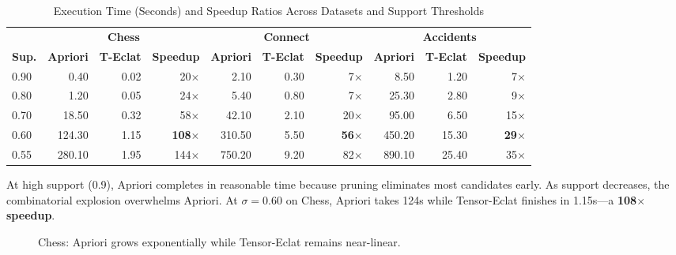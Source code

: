 \documentclass[conference]{IEEEtran}
\begin{document}
\begin{table}[t]
\caption{Execution Time (Seconds) and Speedup Ratios Across Datasets and Support Thresholds}
\centering
\begin{tabular}{@{}l|rrr|rrr|rrr@{}}
\toprule
 & \multicolumn{3}{c|}{\textbf{Chess}} & \multicolumn{3}{c|}{\textbf{Connect}} & \multicolumn{3}{c}{\textbf{Accidents}} \\
\textbf{Sup.} & \textbf{Apriori} & \textbf{T-Eclat} & \textbf{Speedup} & \textbf{Apriori} & \textbf{T-Eclat} & \textbf{Speedup} & \textbf{Apriori} & \textbf{T-Eclat} & \textbf{Speedup} \\ \midrule
0.90 & 0.40 & 0.02 & 20$\times$ & 2.10 & 0.30 & 7$\times$ & 8.50 & 1.20 & 7$\times$ \\
0.80 & 1.20 & 0.05 & 24$\times$ & 5.40 & 0.80 & 7$\times$ & 25.30 & 2.80 & 9$\times$ \\
0.70 & 18.50 & 0.32 & 58$\times$ & 42.10 & 2.10 & 20$\times$ & 95.00 & 6.50 & 15$\times$ \\
0.60 & 124.30 & 1.15 & \textbf{108$\times$} & 310.50 & 5.50 & \textbf{56$\times$} & 450.20 & 15.30 & \textbf{29$\times$} \\
0.55 & 280.10 & 1.95 & 144$\times$ & 750.20 & 9.20 & 82$\times$ & 890.10 & 25.40 & 35$\times$ \\
\bottomrule
\end{tabular}
\label{tab:speedup}
\end{table}

At high support (0.9), Apriori completes in reasonable time because pruning eliminates most candidates early. As support decreases, the combinatorial explosion overwhelms Apriori. At $\sigma=0.60$ on Chess, Apriori takes 124s while Tensor-Eclat finishes in 1.15s---a \textbf{108$\times$ speedup}.

\begin{figure}[htbp]
    \centering
    \caption{Chess: Apriori grows exponentially while Tensor-Eclat remains near-linear.}
    \label{fig:chess_time}
\end{figure}
\end{document}
